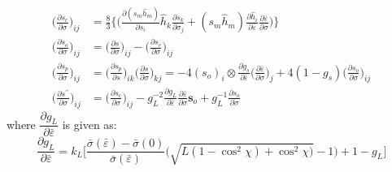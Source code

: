 \documentclass[12pt]{amsart}
\begin{document}
\begin{equation}
  \label{eq:dsp_dsig}
  \begin{split}
    \bigg(\frac{\partial s_c}{\partial \sigma}\bigg)_{ij}&=\frac{8}{3}\Bigg\{\bigg( \frac{\partial (s_m\hat{h}_m)}{\partial s_i}\hat{h}_k\frac{\partial s_k}{\partial\sigma_j} +(s_m\hat{h}_m) \frac{\partial \hat{h}_i}{\partial \bar{\varepsilon}}\frac{\partial\bar{\varepsilon}}{\partial\sigma} \bigg)  \Bigg\}\\
    \bigg(\frac{\partial s_o}{\partial \sigma}\bigg)_{ij}&=\bigg(\frac{\partial s}{\partial\sigma}\bigg)_{ij}-\bigg(\frac{\partial s_c}{\partial \sigma}\bigg)_{ij}\\
    \bigg(\frac{\partial s_p}{\partial \sigma}\bigg)_{ij}&=\bigg(\frac{\partial s_p}{\partial s}\bigg)_{ik} \bigg(\frac{\partial s}{\partial \sigma}\bigg)_{kj}= -4(s_o)_i\otimes\frac{\partial g_s}{\partial \bar{\varepsilon}}\bigg(\frac{\partial\bar{\varepsilon}}{\partial\sigma}\bigg)_j + 4(1-g_s) \bigg(\frac{\partial s_o}{\partial \sigma}\bigg)_{ij}\\
    \bigg(\frac{\partial s^{\prime\prime}}{\partial\sigma}\bigg)_{ij}&=\bigg(\frac{\partial s_c}{\partial\sigma}\bigg)_{ij}-g_L^{-2}\frac{\partial g_L}{\partial\bar{\varepsilon}}\frac{\partial\bar{\varepsilon}}{\partial \sigma}\mathbf{s}_o+g_L^{-1}\frac{\partial s_o}{\partial\sigma}
  \end{split}
\end{equation}
where $\dfrac{\partial g_L}{\partial\bar{\varepsilon}}$ is given as:
\begin{equation}
  \label{eq:dgl_de}
  \dfrac{\partial g_L}{\partial\bar{\varepsilon}}=k_L\bigg[\frac{\bar{\sigma}(\bar{\varepsilon})-\bar{\sigma}(0)}{\bar{\sigma}(\bar{\varepsilon})}
  \bigg(\sqrt{L(1-\cos^2\chi)+\cos^2\chi)}-1\bigg)+1-g_L\bigg]
\end{equation}


\newpage
\end{document}
